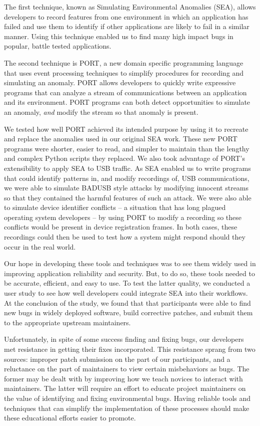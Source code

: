 The first technique,
known as Simulating Environmental Anomalies (SEA),
allows developers to record features from one environment in which
an application has failed and use them to identify if other
applications are likely to fail in a similar manner.
Using this technique enabled us to find many high impact bugs in popular,
battle tested applications.

The second technique is PORT, 
a new  domain specific programming language
that uses event processing techniques
to simplify procedures for recording and simulating an anomaly.
PORT
allows developers
to quickly write expressive programs that can analyze a stream of communications between an application and  its environment.
PORT programs can both detect opportunities to
simulate an anomaly, \textit{and} modify the stream so that anomaly is present.

We tested how well PORT achieved its intended purpose by using it to recreate and
replace the anomalies used in our original SEA work.
These new PORT programs were shorter, easier to read, and simpler to
maintain than the lengthy and complex Python scripts they replaced.
We also took advantage of PORT's extensibility to apply SEA to USB
traffic.
As SEA enabled us to write programs that could identify patterns in, and
modify recordings of, USB communications,
we were able to simulate
BADUSB style attacks by modifying innocent streams
so that they contained the harmful features of such an attack.
We were also able to simulate device identifier conflicts -- a situation that has
long plagued operating system developers -- by using PORT to modify a recording so  these conflicts
would be present in device registration frames.
In both cases, these recordings could then be used
to test how a system might respond should they occur in the real world.

Our hope in developing these tools and techniques was to see them widely
used in improving application reliability and security.
But, to do so, these tools needed to be accurate, efficient, and easy to use. To test the latter quality, we 
conducted a user study to see how well developers could integrate SEA into their workflows.
At the conclusion of the study, we found that that participants were able to find new bugs in widely deployed software,
build corrective patches,
and submit them to the appropriate upstream maintainers.

Unfortunately,
in spite of some success finding and fixing bugs,
our developers met resistance in getting their fixes incorporated.
This resistance sprang from two sources: improper patch submission on the part of our participants, and a reluctance on the part of maintainers to view certain misbehaviors as bugs.
The former may be dealt with by improving how we teach novices to interact with maintainers. The latter
will require an effort to educate project maintainers on the value of identifying and fixing environmental bugs. Having reliable tools and techniques that can  simplify the implementation of these processes should make these educational efforts easier to promote. 


\vspace*{3ex plus 1fil}
